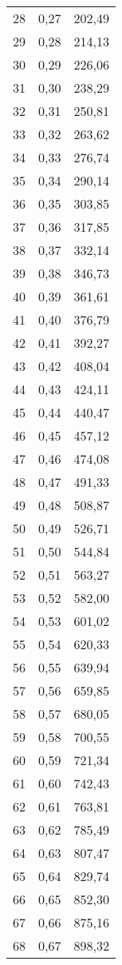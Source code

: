 \documentclass[]{article}
\begin{document}
\begin{longtable}[t]{ccc}
28 & 0,27 & 202,49\\
29 & 0,28 & 214,13\\
30 & 0,29 & 226,06\\
31 & 0,30 & 238,29\\
32 & 0,31 & 250,81\\
33 & 0,32 & 263,62\\
34 & 0,33 & 276,74\\
35 & 0,34 & 290,14\\
36 & 0,35 & 303,85\\
37 & 0,36 & 317,85\\
38 & 0,37 & 332,14\\
39 & 0,38 & 346,73\\
40 & 0,39 & 361,61\\
41 & 0,40 & 376,79\\
42 & 0,41 & 392,27\\
43 & 0,42 & 408,04\\
44 & 0,43 & 424,11\\
45 & 0,44 & 440,47\\
46 & 0,45 & 457,12\\
47 & 0,46 & 474,08\\
48 & 0,47 & 491,33\\
49 & 0,48 & 508,87\\
50 & 0,49 & 526,71\\
51 & 0,50 & 544,84\\
52 & 0,51 & 563,27\\
53 & 0,52 & 582,00\\
54 & 0,53 & 601,02\\
55 & 0,54 & 620,33\\
56 & 0,55 & 639,94\\
57 & 0,56 & 659,85\\
58 & 0,57 & 680,05\\
59 & 0,58 & 700,55\\
60 & 0,59 & 721,34\\
61 & 0,60 & 742,43\\
62 & 0,61 & 763,81\\
63 & 0,62 & 785,49\\
64 & 0,63 & 807,47\\
65 & 0,64 & 829,74\\
66 & 0,65 & 852,30\\
67 & 0,66 & 875,16\\
68 & 0,67 & 898,32\\*
\end{longtable}

\clearpage
\end{document}
